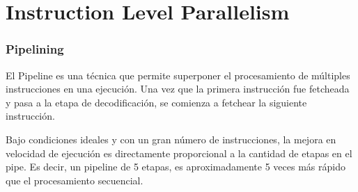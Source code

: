 %
%
%
%
%

\newpage
\part{Instruction Level Parallelism}
\section{Pipelining}
El Pipeline es una técnica que permite superponer el procesamiento de múltiples instrucciones en una ejecución. Una vez que la primera instrucción fue fetcheada y pasa a la etapa de decodificación, se comienza a fetchear la siguiente instrucción. 

Bajo condiciones ideales y con un gran número de instrucciones, la mejora en velocidad de ejecución es directamente proporcional a la cantidad de etapas en el pipe. Es decir, un pipeline de 5 etapas, es aproximadamente 5 veces más rápido que el procesamiento secuencial.  


